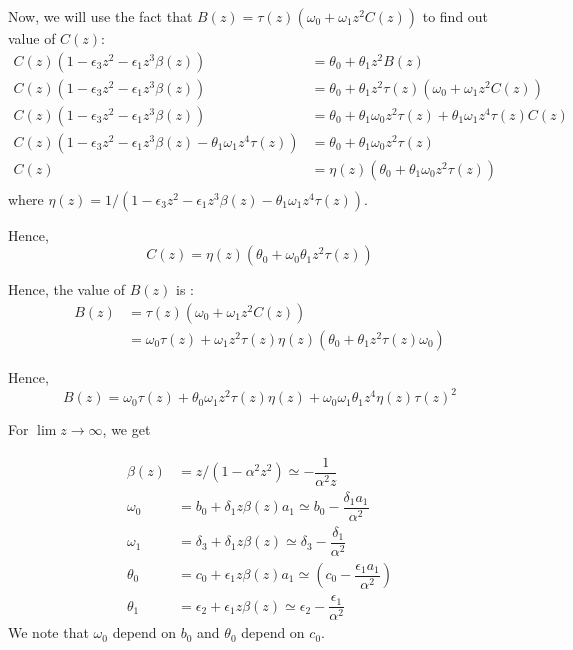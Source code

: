 \documentclass[11pt,a4paper]{article}
\begin{document}
Now, we will use the fact that $B(z)  =  \tau(z) ( \omega_0+    \omega_1 z^2 C(z) )$ to find out value of $C(z)$:
\begin{align*}
C(z)(1 - \epsilon_3 z^2 - \epsilon_1  z^3   \beta(z))  &=  \theta_0+ \theta_1  z^2 B(z) \\
C(z)(1 - \epsilon_3 z^2 - \epsilon_1  z^3   \beta(z))  &=  \theta_0+ \theta_1  z^2 \tau(z) ( \omega_0+    \omega_1 z^2 C(z) ) \\
C(z)(1 - \epsilon_3 z^2 - \epsilon_1  z^3   \beta(z))  &=  \theta_0+ \theta_1 \omega_0  z^2 \tau(z)   + \theta_1   \omega_1  z^4 \tau(z)    C(z) \\
C(z)(1 - \epsilon_3 z^2 - \epsilon_1  z^3   \beta(z) -\theta_1   \omega_1  z^4 \tau(z)   )  &=  \theta_0+ \theta_1 \omega_0 z^2 \tau(z)    \\
C(z)  &=  \eta(z)( \theta_0+ \theta_1  \omega_0 z^2 \tau(z)  ) \\
\end{align*}
where $\eta(z)=1/(1 - \epsilon_3 z^2 - \epsilon_1  z^3   \beta(z) -\theta_1   \omega_1  z^4 \tau(z)   )$.

Hence, 
\begin{equation}
\boxed{C(z)  =  \eta(z) (\theta_0+  \omega_0 \theta_1  z^2  \tau(z) )  }
\end{equation}

Hence, the value of $B(z)$ is :
\begin{align*}
B(z)  &=   \tau(z)( \omega_0  +    \omega_1 z^2  C(z)) \\
&= \omega_0 \tau(z) +    \omega_1 z^2  \tau(z) \eta(z)( \theta_0+ \theta_1  z^2 \tau(z)  \omega_0 ) 
\end{align*}


Hence, 
\begin{equation}
\boxed{B(z)  = \omega_0 \tau(z) +   \theta_0 \omega_1 z^2  \tau(z) \eta(z)  + \omega_0 \omega_1  \theta_1    z^4 \eta(z)  \tau(z) ^2   }
\end{equation}

 For $\lim z \rightarrow \infty$, we get 


\begin{align*}
\beta(z) &= z/(1 -\alpha^2  z^2 ) \simeq -\dfrac{1}{\alpha^2 z} \\
 \omega_0 &= b_0 +  \delta_1  z   \beta(z)  a_1 \simeq b_0 - \dfrac{ \delta_1  a_1}{\alpha^2}  \\
\omega_1 &= \delta_3 +  \delta_1  z    \beta(z)  \simeq \delta_3  -\dfrac{\delta_1}{\alpha^2 } \\  
 \theta_0&= c_0 +  \epsilon_1  z \beta(z) a_1 \simeq \left(c_0 -\dfrac{\epsilon_1   a_1}{\alpha^2}  \right)  \\
\theta_1&= \epsilon_2 + \epsilon_1   z \beta(z) \simeq \epsilon_2  -\dfrac{\epsilon_1 }{\alpha^2 }
\end{align*}
We note that $\omega_0$ depend on $b_0$ and $\theta_0$ depend on $c_0$.
\end{document}
